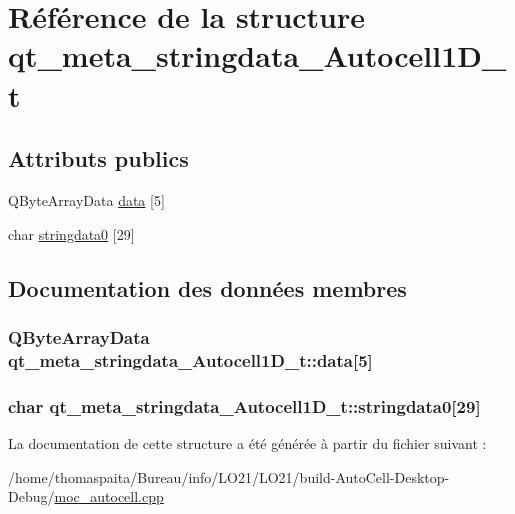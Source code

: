 \hypertarget{structqt__meta__stringdata___autocell1_d__t}{}\section{Référence de la structure qt\+\_\+meta\+\_\+stringdata\+\_\+\+Autocell1\+D\+\_\+t}
\label{structqt__meta__stringdata___autocell1_d__t}
\subsection*{Attributs publics}
\begin{DoxyCompactItemize}
\item 
Q\+Byte\+Array\+Data \hyperlink{structqt__meta__stringdata___autocell1_d__t_ad3d50b47a705a24ada7c255ddd8c526b}{data} \mbox{[}5\mbox{]}
\item 
char \hyperlink{structqt__meta__stringdata___autocell1_d__t_aa63fa3b230b4bd59751df0a366afe39f}{stringdata0} \mbox{[}29\mbox{]}
\end{DoxyCompactItemize}


\subsection{Documentation des données membres}
\subsubsection[{\texorpdfstring{data}{data}}]{\setlength{\rightskip}{0pt plus 5cm}Q\+Byte\+Array\+Data qt\+\_\+meta\+\_\+stringdata\+\_\+\+Autocell1\+D\+\_\+t\+::data\mbox{[}5\mbox{]}}\hypertarget{structqt__meta__stringdata___autocell1_d__t_ad3d50b47a705a24ada7c255ddd8c526b}{}\label{structqt__meta__stringdata___autocell1_d__t_ad3d50b47a705a24ada7c255ddd8c526b}
\subsubsection[{\texorpdfstring{stringdata0}{stringdata0}}]{\setlength{\rightskip}{0pt plus 5cm}char qt\+\_\+meta\+\_\+stringdata\+\_\+\+Autocell1\+D\+\_\+t\+::stringdata0\mbox{[}29\mbox{]}}\hypertarget{structqt__meta__stringdata___autocell1_d__t_aa63fa3b230b4bd59751df0a366afe39f}{}\label{structqt__meta__stringdata___autocell1_d__t_aa63fa3b230b4bd59751df0a366afe39f}


La documentation de cette structure a été générée à partir du fichier suivant \+:\begin{DoxyCompactItemize}
\item 
/home/thomaspaita/\+Bureau/info/\+L\+O21/\+L\+O21/build-\/\+Auto\+Cell-\/\+Desktop-\/\+Debug/\hyperlink{moc__autocell_8cpp}{moc\+\_\+autocell.\+cpp}\end{DoxyCompactItemize}
